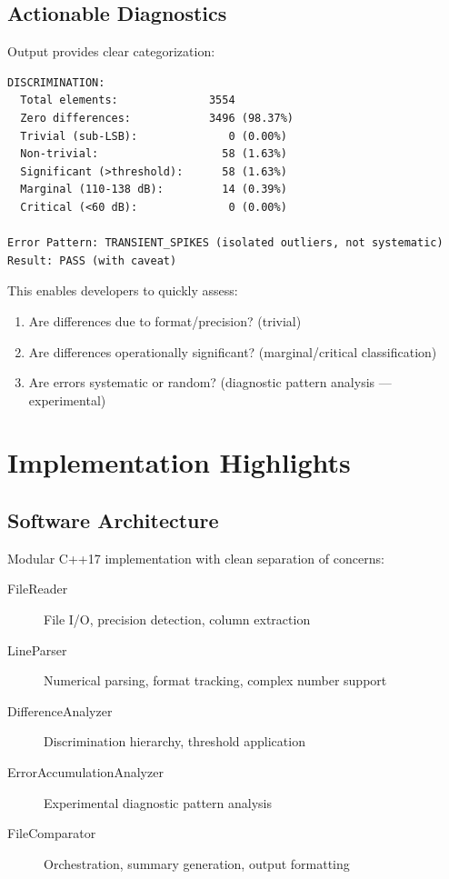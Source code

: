 \documentclass[11pt,letterpaper]{article}
\begin{document}
\subsection{Actionable Diagnostics}

Output provides clear categorization:
\begin{verbatim}
DISCRIMINATION:
  Total elements:              3554
  Zero differences:            3496 (98.37%)
  Trivial (sub-LSB):              0 (0.00%)
  Non-trivial:                   58 (1.63%)
  Significant (>threshold):      58 (1.63%)
  Marginal (110-138 dB):         14 (0.39%)
  Critical (<60 dB):              0 (0.00%)

Error Pattern: TRANSIENT_SPIKES (isolated outliers, not systematic)
Result: PASS (with caveat)
\end{verbatim}

This enables developers to quickly assess:
\begin{enumerate}
    \item Are differences due to format/precision? (trivial)
    \item Are differences operationally significant? (marginal/critical classification)
    \item Are errors systematic or random? (diagnostic pattern analysis — experimental)
\end{enumerate}

\section{Implementation Highlights}
\label{sec:implementation}

\subsection{Software Architecture}

Modular C++17 implementation with clean separation of concerns:

\begin{description}
    \item[FileReader] File I/O, precision detection, column extraction
    \item[LineParser] Numerical parsing, format tracking, complex number support
    \item[DifferenceAnalyzer] Discrimination hierarchy, threshold application
    \item[ErrorAccumulationAnalyzer] Experimental diagnostic pattern analysis
    \item[FileComparator] Orchestration, summary generation, output formatting
\end{description}
\end{document}
